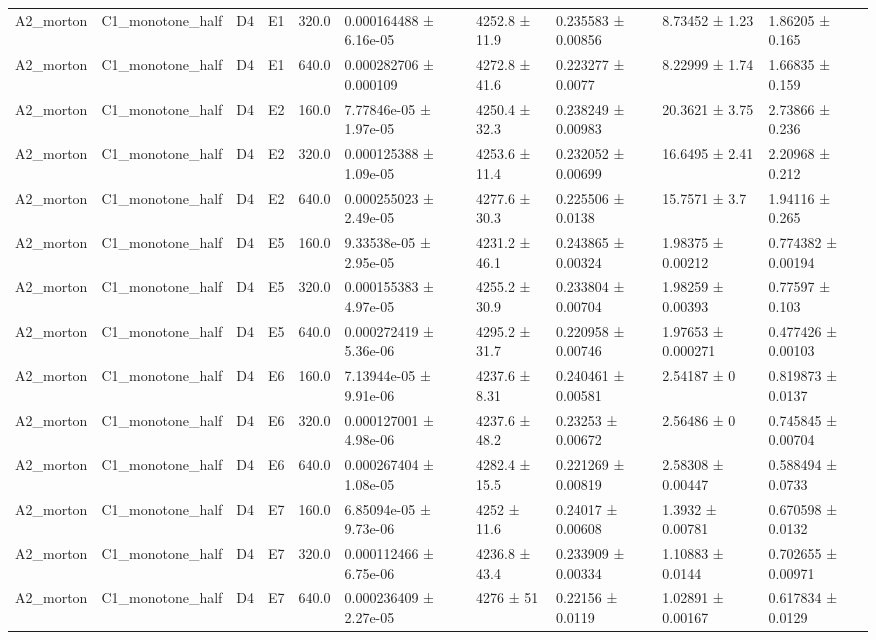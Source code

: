 \begin{table}
\begin{tabular}{llllllllll}
A2\_morton & C1\_monotone\_half & D4 & E1 & 320.0 & 0.000164488 ± 6.16e-05 & 4252.8 ± 11.9 & 0.235583 ± 0.00856 & 8.73452 ± 1.23 & 1.86205 ± 0.165 \\
A2\_morton & C1\_monotone\_half & D4 & E1 & 640.0 & 0.000282706 ± 0.000109 & 4272.8 ± 41.6 & 0.223277 ± 0.0077 & 8.22999 ± 1.74 & 1.66835 ± 0.159 \\
A2\_morton & C1\_monotone\_half & D4 & E2 & 160.0 & 7.77846e-05 ± 1.97e-05 & 4250.4 ± 32.3 & 0.238249 ± 0.00983 & 20.3621 ± 3.75 & 2.73866 ± 0.236 \\
A2\_morton & C1\_monotone\_half & D4 & E2 & 320.0 & 0.000125388 ± 1.09e-05 & 4253.6 ± 11.4 & 0.232052 ± 0.00699 & 16.6495 ± 2.41 & 2.20968 ± 0.212 \\
A2\_morton & C1\_monotone\_half & D4 & E2 & 640.0 & 0.000255023 ± 2.49e-05 & 4277.6 ± 30.3 & 0.225506 ± 0.0138 & 15.7571 ± 3.7 & 1.94116 ± 0.265 \\
A2\_morton & C1\_monotone\_half & D4 & E5 & 160.0 & 9.33538e-05 ± 2.95e-05 & 4231.2 ± 46.1 & 0.243865 ± 0.00324 & 1.98375 ± 0.00212 & 0.774382 ± 0.00194 \\
A2\_morton & C1\_monotone\_half & D4 & E5 & 320.0 & 0.000155383 ± 4.97e-05 & 4255.2 ± 30.9 & 0.233804 ± 0.00704 & 1.98259 ± 0.00393 & 0.77597 ± 0.103 \\
A2\_morton & C1\_monotone\_half & D4 & E5 & 640.0 & 0.000272419 ± 5.36e-06 & 4295.2 ± 31.7 & 0.220958 ± 0.00746 & 1.97653 ± 0.000271 & 0.477426 ± 0.00103 \\
A2\_morton & C1\_monotone\_half & D4 & E6 & 160.0 & 7.13944e-05 ± 9.91e-06 & 4237.6 ± 8.31 & 0.240461 ± 0.00581 & 2.54187 ± 0 & 0.819873 ± 0.0137 \\
A2\_morton & C1\_monotone\_half & D4 & E6 & 320.0 & 0.000127001 ± 4.98e-06 & 4237.6 ± 48.2 & 0.23253 ± 0.00672 & 2.56486 ± 0 & 0.745845 ± 0.00704 \\
A2\_morton & C1\_monotone\_half & D4 & E6 & 640.0 & 0.000267404 ± 1.08e-05 & 4282.4 ± 15.5 & 0.221269 ± 0.00819 & 2.58308 ± 0.00447 & 0.588494 ± 0.0733 \\
A2\_morton & C1\_monotone\_half & D4 & E7 & 160.0 & 6.85094e-05 ± 9.73e-06 & 4252 ± 11.6 & 0.24017 ± 0.00608 & 1.3932 ± 0.00781 & 0.670598 ± 0.0132 \\
A2\_morton & C1\_monotone\_half & D4 & E7 & 320.0 & 0.000112466 ± 6.75e-06 & 4236.8 ± 43.4 & 0.233909 ± 0.00334 & 1.10883 ± 0.0144 & 0.702655 ± 0.00971 \\
A2\_morton & C1\_monotone\_half & D4 & E7 & 640.0 & 0.000236409 ± 2.27e-05 & 4276 ± 51 & 0.22156 ± 0.0119 & 1.02891 ± 0.00167 & 0.617834 ± 0.0129 \\

\end{tabular}
\end{table}
